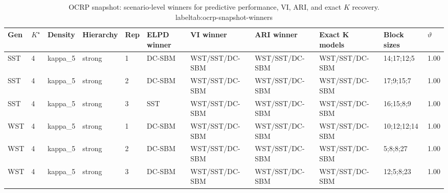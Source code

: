 \begin{table}[!h]
\centering
\caption{OCRP snapshot: scenario-level winners for predictive performance, VI, ARI, and exact $K$ recovery.\\label{tab:ocrp-snapshot-winners}}
\centering
\begin{tabular}[t]{lllllllllll}
\toprule
Gen & $K^\star$ & Density & Hierarchy & Rep & ELPD winner & VI winner & ARI winner & Exact K models & Block sizes & $\vartheta$\\
\midrule
SST & 4 & kappa_5 & strong & 1 & DC-SBM & WST/SST/DC-SBM & WST/SST/DC-SBM & WST/SST/DC-SBM & 14;17;12;5 & 1.00\\
SST & 4 & kappa_5 & strong & 2 & DC-SBM & WST/SST/DC-SBM & WST/SST/DC-SBM & WST/SST/DC-SBM & 17;9;15;7 & 1.00\\
SST & 4 & kappa_5 & strong & 3 & SST & WST/SST/DC-SBM & WST/SST/DC-SBM & WST/SST/DC-SBM & 16;15;8;9 & 1.00\\
WST & 4 & kappa_5 & strong & 1 & DC-SBM & WST/SST/DC-SBM & WST/SST/DC-SBM & WST/SST/DC-SBM & 10;12;12;14 & 1.00\\
WST & 4 & kappa_5 & strong & 2 & DC-SBM & WST/SST/DC-SBM & WST/SST/DC-SBM & WST/SST/DC-SBM & 5;8;8;27 & 1.00\\
WST & 4 & kappa_5 & strong & 3 & DC-SBM & WST/SST/DC-SBM & WST/SST/DC-SBM & WST/SST/DC-SBM & 12;5;8;23 & 1.00\\
\bottomrule
\end{tabular}
\end{table}
